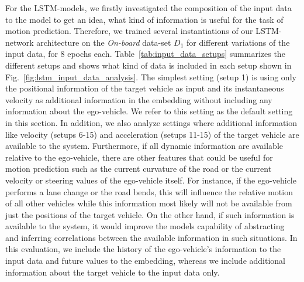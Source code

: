 For the \ac{LSTM}-models, we firstly investigated the composition of the input data to the model to get an idea, what kind of information is useful for the task of motion prediction.
Therefore, we trained several instantiations of our \ac{LSTM}-network architecture on the \emph{On-board} data-set $D_1$ for different variations of the input data, for \num{8} epochs each.
Table~\ref{tab:input_data_setups} summarizes the different setups and shows what kind of data is included in each setup shown in Fig.~\ref{fig:lstm_input_data_analysis}.
The simplest setting (setup \num{1}) is using only the positional information of the target vehicle as input and its instantaneous velocity as additional information in the embedding without including any information about the ego-vehicle.
We refer to this setting as the default setting in this section.
In addition, we also analyze settings where additional information like velocity (setups \num{6}-\num{15}) and acceleration (setups \num{11}-\num{15}) of the target vehicle are available to the system.
Furthermore, if all dynamic information are available relative to the ego-vehicle, there are other features that could be useful for motion prediction such as the current curvature of the road or the current velocity or steering values of the ego-vehicle itself.
For instance, if the ego-vehicle performs a lane change or the road bends, this will influence the relative motion of all other vehicles while this information most likely will not be available from just the positions of the target vehicle. 
On the other hand, if such information is available to the system, it would improve the models capability of abstracting and inferring correlations between the available information in such situations.
In this evaluation, we include the history of the ego-vehicle's information to the input data and future values to the embedding, whereas we include additional information about the target vehicle to the input data only. 

